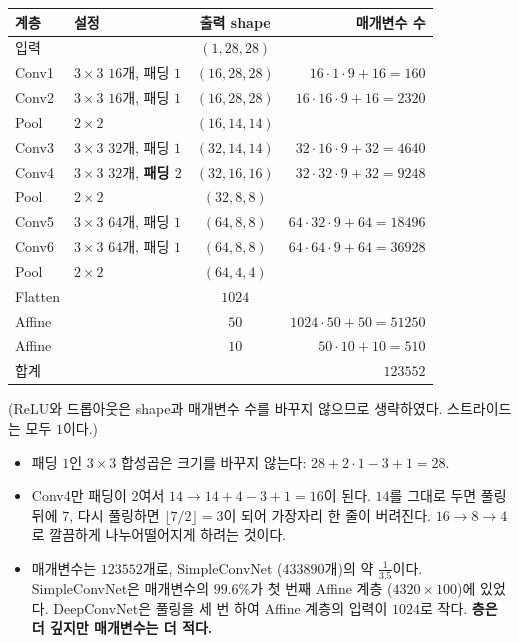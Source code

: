\documentclass[11pt,a4paper]{article}
\begin{document}
\begin{center}
{\small
\begin{tabular}{@{}llcr@{}}
\toprule
계층 & 설정 & 출력 shape & 매개변수 수 \\
\midrule
입력 & & $(1,28,28)$ & \\
Conv1 & $3\times3$ $16$개, 패딩 $1$ & $(16,28,28)$ & $16\cdot1\cdot9+16=160$ \\
Conv2 & $3\times3$ $16$개, 패딩 $1$ & $(16,28,28)$ & $16\cdot16\cdot9+16=2320$ \\
Pool & $2\times2$ & $(16,14,14)$ & \\
Conv3 & $3\times3$ $32$개, 패딩 $1$ & $(32,14,14)$ & $32\cdot16\cdot9+32=4640$ \\
Conv4 & $3\times3$ $32$개, \textbf{패딩 $2$} & $(32,16,16)$ & $32\cdot32\cdot9+32=9248$ \\
Pool & $2\times2$ & $(32,8,8)$ & \\
Conv5 & $3\times3$ $64$개, 패딩 $1$ & $(64,8,8)$ & $64\cdot32\cdot9+64=18496$ \\
Conv6 & $3\times3$ $64$개, 패딩 $1$ & $(64,8,8)$ & $64\cdot64\cdot9+64=36928$ \\
Pool & $2\times2$ & $(64,4,4)$ & \\
Flatten & & $1024$ & \\
Affine & & $50$ & $1024\cdot50+50=51250$ \\
Affine & & $10$ & $50\cdot10+10=510$ \\
\midrule
합계 & & & $123552$ \\
\bottomrule
\end{tabular}}

(ReLU와 드롭아웃은 shape과 매개변수 수를 바꾸지 않으므로 생략하였다. 스트라이드는 모두 $1$이다.)
\end{center}

\begin{itemize}[leftmargin=1.5em]
\item 패딩 $1$인 $3\times3$ 합성곱은 크기를 바꾸지 않는다: $28+2\cdot1-3+1=28$.
\item Conv4만 패딩이 $2$여서 $14\to14+4-3+1=16$이 된다. $14$를 그대로 두면 풀링 뒤에 $7$, 다시 풀링하면 $\lfloor7/2\rfloor=3$이 되어
가장자리 한 줄이 버려진다. $16\to8\to4$로 깔끔하게 나누어떨어지게 하려는 것이다.
\item 매개변수는 $123552$개로, SimpleConvNet ($433890$개)의 약 $\frac{1}{3.5}$이다.
SimpleConvNet은 매개변수의 $99.6\%$가 첫 번째 Affine 계층 ($4320\times100$)에 있었다.
DeepConvNet은 풀링을 세 번 하여 Affine 계층의 입력이 $1024$로 작다.
\textbf{층은 더 깊지만 매개변수는 더 적다.}
\end{itemize}
\end{document}
